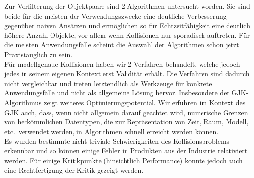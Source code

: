 

Zur Vorfilterung der Objektpaare sind 2 Algorithmen untersucht worden. Sie sind beide für die meisten der Verwendungszwecke  eine deutliche Verbesserung gegenüber naiven Ansätzen und ermöglichen so für Echtzeitfähigkeit eine deutlich höhere Anzahl Objekte, vor allem wenn Kollisionen nur sporadisch auftreten. Für die meisten Anwendungsfälle scheint die Auswahl der Algorithmen schon jetzt Praxistauglich zu sein.\\
Für modellgenaue Kollisionen haben wir 2 Verfahren behandelt, welche jedoch jedes in seinem eigenen Kontext erst Validität erhält. Die Verfahren sind dadurch nicht vergleichbar und treten letztendlich als Werkzeuge für konkrete Anwendungsfälle und nicht als allgemeine Lösung hervor. Insbesondere der GJK-Algorithmus zeigt weiteres Optimierungspotential. Wir erfuhren im Kontext des GJK auch, dass, wenn nicht allgemein darauf geachtet wird, numerische Grenzen von herkömmlichen Datentypen, die zur Repräsentation von Zeit, Raum, Modell, etc.~verwendet werden, in Algorithmen schnell erreicht werden können.\\
Es wurden bestimmte nicht-triviale Schwierigkeiten des Kollisionsproblems erkennbar und so können einige Fehler in Produkten aus der Industrie relativiert werden. Für einige Kritikpunkte (hinsichtlich Performance) konnte jedoch auch eine Rechtfertigung der Kritik gezeigt werden.
